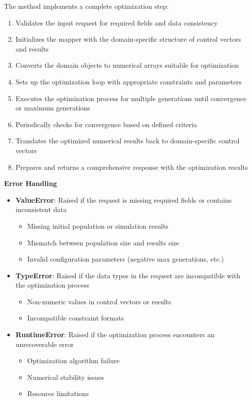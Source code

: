\begin{itemize}
	The method implements a complete optimization step:
	\begin{enumerate}
		\item Validates the input request for required fields and data consistency
		\item Initializes the mapper with the domain-specific structure of control vectors and results
		\item Converts the domain objects to numerical arrays suitable for optimization
		\item Sets up the optimization loop with appropriate constraints and parameters
		\item Executes the optimization process for multiple generations until convergence or maximum generations
		\item Periodically checks for convergence based on defined criteria
		\item Translates the optimized numerical results back to domain-specific control vectors
		\item Prepares and returns a comprehensive response with the optimization results
	\end{enumerate}

	\textbf{Error Handling}
	\begin{itemize}
		\item \textbf{ValueError}: Raised if the request is missing required fields or contains inconsistent data
		\begin{itemize}
			\item Missing initial population or simulation results
			\item Mismatch between population size and results size
			\item Invalid configuration parameters (negative max generations, etc.)
		\end{itemize}

		\item \textbf{TypeError}: Raised if the data types in the request are incompatible with the optimization process
		\begin{itemize}
			\item Non-numeric values in control vectors or results
			\item Incompatible constraint formats
		\end{itemize}

		\item \textbf{RuntimeError}: Raised if the optimization process encounters an unrecoverable error
		\begin{itemize}
			\item Optimization algorithm failure
			\item Numerical stability issues
			\item Resource limitations
		\end{itemize}


\end{itemize}
\end{itemize}
